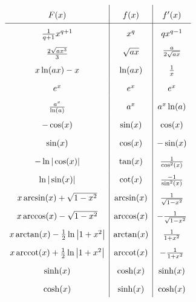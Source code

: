 \begin{multicols}{2}
\everymath{\displaystyle}	%
\begin{math}\renewcommand{\arraystretch}{1.8}
\begin{array}{c|c|c}
F(x) & f(x) & f'(x) \\ \hline
\frac{1}{q+1}x^{q+1} & x^q & qx^{q-1} \\
\raisebox{-0.2em}{$\frac{2\sqrt{ax^3}}{3}$} & \sqrt{ax} & \raisebox{0.2em}{$\frac{a}{2\sqrt{ax}}$}\\
x\ln(ax) -x & \ln(ax) & \textstyle \frac{1}{x}\\
e^x & e^x & e^x \\
\frac{a^x}{\ln(a)} & a^x & a^x \ln(a) \\
-\cos(x) & \sin(x) & \cos(x)\\
\sin(x) & \cos(x) & -\sin(x)\\
-\ln |\cos(x)| & \tan(x) & \frac{1}{\cos^2(x)} \\
\ln |\sin(x)| & \cot(x) & \frac{-1}{\sin^2(x)} \\
x\arcsin (x)+\sqrt{1-x^2} & \arcsin(x) & \frac{1}{\sqrt{1-x^2}}\\
x\arccos (x)-\sqrt{1-x^2} & \arccos(x) & -\frac{1}{\sqrt{1-x^2}}\\
x\arctan (x)-\frac{1}{2} \ln \left| 1+ x^2 \right| & \arctan (x) & \frac{1}{1+x^2} \\
x\arccot (x)+\frac{1}{2} \ln \left| 1+ x^2 \right| & \arccot (x) & -\frac{1}{1+x^2} \\
\sinh(x) & \cosh(x) & \sinh (x) \\
\cosh(x) & \sinh(x) & \cosh (x)\\
\end{array}
\end{math}
\everymath{\textstyle}
\end{multicols}
